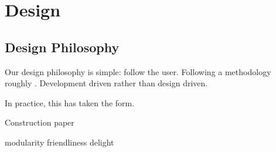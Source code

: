 \chapter{Design}

\section{Design Philosophy}\label{design-philosophy}

Our design philosophy is simple: follow the user. Following a
methodology roughly . Development driven rather than design driven.

In practice, this has taken the form.

Construction paper

modularity friendliness delight
